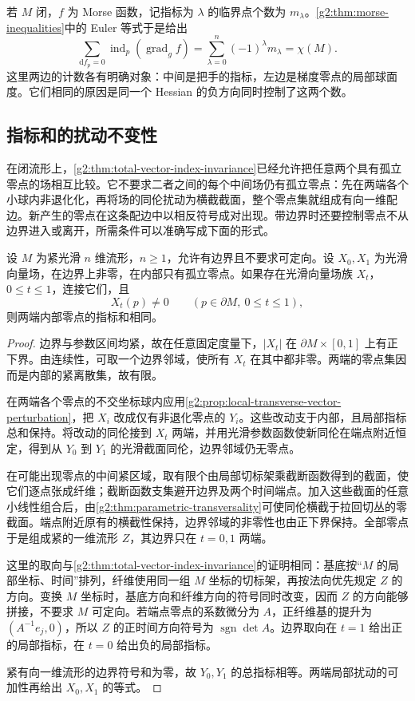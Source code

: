 若 \(M\) 闭，\(f\) 为 Morse 函数，记指标为 \(\lambda\) 的临界点个数为 \(m_\lambda\)。\cref{g2:thm:morse-inequalities}中的 Euler 等式于是给出
\begin{equation}\label{g2:eq:morse-gradient-index-sum}
	\sum_{\mathrm df_p=0}\operatorname{ind}_p(\operatorname{grad}_g f)
	=\sum_{\lambda=0}^n(-1)^\lambda m_\lambda
	=\chi(M).
\end{equation}
这里两边的计数各有明确对象：中间是把手的指标，左边是梯度零点的局部球面度。它们相同的原因是同一个 Hessian 的负方向同时控制了这两个数。

\subsection{指标和的扰动不变性}
\label{g2:subsec:1704:02}

在闭流形上，\cref{g2:thm:total-vector-index-invariance}已经允许把任意两个具有孤立零点的场相互比较。它不要求二者之间的每个中间场仍有孤立零点：先在两端各个小球内非退化化，再将场的同伦扰动为横截截面，整个零点集就组成有向一维配边。新产生的零点在这条配边中以相反符号成对出现。带边界时还要控制零点不从边界进入或离开，所需条件可以准确写成下面的形式。

\begin{lemma}\label{g2:lem:relative-total-index-invariance}
	设 \(M\) 为紧光滑 \(n\) 维流形，\(n\ge1\)，允许有边界且不要求可定向。设 \(X_0,X_1\) 为光滑向量场，在边界上非零，在内部只有孤立零点。如果存在光滑向量场族 \(X_t\)，\(0\le t\le1\)，连接它们，且
	\[
		X_t(p)\ne0\qquad(p\in\partial M,\ 0\le t\le1),
	\]
	则两端内部零点的指标和相同。
\end{lemma}
\begin{proof}
	边界与参数区间均紧，故在任意固定度量下，\(|X_t|\) 在 \(\partial M\times[0,1]\) 上有正下界。由连续性，可取一个边界邻域，使所有 \(X_t\) 在其中都非零。两端的零点集因而是内部的紧离散集，故有限。

	在两端各个零点的不交坐标球内应用\cref{g2:prop:local-transverse-vector-perturbation}，把 \(X_i\) 改成仅有非退化零点的 \(Y_i\)。这些改动支于内部，且局部指标总和保持。将改动的同伦接到 \(X_t\) 两端，并用光滑参数函数使新同伦在端点附近恒定，得到从 \(Y_0\) 到 \(Y_1\) 的光滑截面同伦，边界邻域仍无零点。

	在可能出现零点的中间紧区域，取有限个由局部切标架乘截断函数得到的截面，使它们逐点张成纤维；截断函数支集避开边界及两个时间端点。加入这些截面的任意小线性组合后，由\cref{g2:thm:parametric-transversality}可使同伦横截于拉回切丛的零截面。端点附近原有的横截性保持，边界邻域的非零性也由正下界保持。全部零点于是组成紧的一维流形 \(Z\)，其边界只在 \(t=0,1\) 两端。

	这里的取向与\cref{g2:thm:total-vector-index-invariance}的证明相同：基底按“\(M\) 的局部坐标、时间”排列，纤维使用同一组 \(M\) 坐标的切标架，再按法向优先规定 \(Z\) 的方向。变换 \(M\) 坐标时，基底方向和纤维方向的符号同时改变，因而 \(Z\) 的方向能够拼接，不要求 \(M\) 可定向。若端点零点的系数微分为 \(A\)，正纤维基的提升为 \((A^{-1}e_j,0)\)，所以 \(Z\) 的正时间方向符号为 \(\operatorname{sgn}\det A\)。边界取向在 \(t=1\) 给出正的局部指标，在 \(t=0\) 给出负的局部指标。

	紧有向一维流形的边界符号和为零，故 \(Y_0,Y_1\) 的总指标相等。两端局部扰动的可加性再给出 \(X_0,X_1\) 的等式。
\end{proof}

